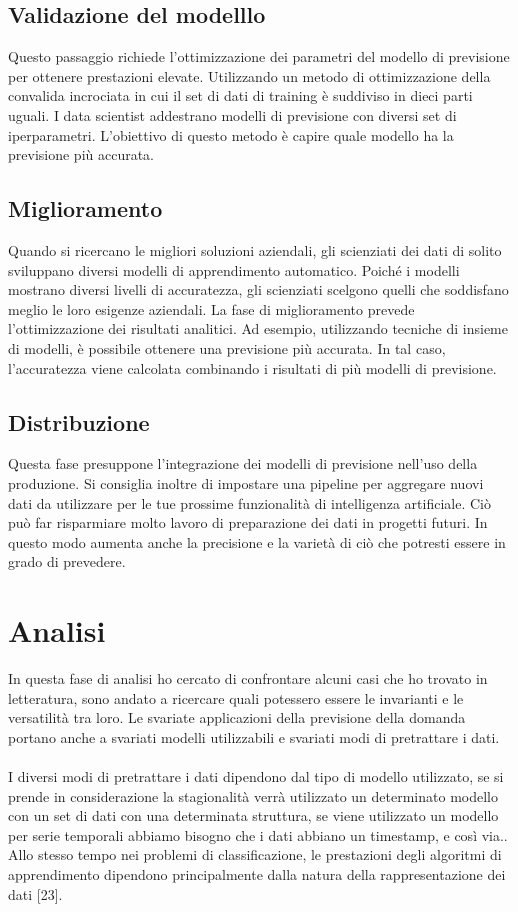 \documentclass[12pt,a4paper]{report}
\begin{document}
\subsection{Validazione del modelllo}
Questo passaggio richiede l'ottimizzazione dei parametri del modello di previsione per ottenere prestazioni elevate. Utilizzando un metodo di ottimizzazione della convalida incrociata in cui il set di dati di training è suddiviso in dieci parti uguali. I data scientist addestrano modelli di previsione con diversi set di iperparametri. L'obiettivo di questo metodo è capire quale modello ha la previsione più accurata.


\subsection{Miglioramento}
Quando si ricercano le migliori soluzioni aziendali, gli scienziati dei dati di solito sviluppano diversi modelli di apprendimento automatico. Poiché i modelli mostrano diversi livelli di accuratezza, gli scienziati scelgono quelli che soddisfano meglio le loro esigenze aziendali. La fase di miglioramento prevede l'ottimizzazione dei risultati analitici. Ad esempio, utilizzando tecniche di insieme di modelli, è possibile ottenere una previsione più accurata. In tal caso, l'accuratezza viene calcolata combinando i risultati di più modelli di previsione.

\subsection{Distribuzione}
Questa fase presuppone l'integrazione dei modelli di previsione nell'uso della produzione. Si consiglia inoltre di impostare una pipeline per aggregare nuovi dati da utilizzare per le tue prossime funzionalità di intelligenza artificiale. Ciò può far risparmiare molto lavoro di preparazione dei dati in progetti futuri. In questo modo aumenta anche la precisione e la varietà di ciò che potresti essere in grado di prevedere.


\section{Analisi}
In questa fase di analisi ho cercato di confrontare alcuni casi che ho trovato in letteratura, sono andato a ricercare quali potessero essere le invarianti e le versatilità tra loro.
Le svariate applicazioni della previsione della domanda portano anche a svariati modelli utilizzabili e svariati modi di pretrattare i dati.\\
\\
I diversi modi di pretrattare i dati dipendono dal tipo di modello utilizzato, se si prende in considerazione la stagionalità verrà utilizzato un determinato modello con un set di dati con una determinata struttura,
se viene utilizzato un modello per serie temporali abbiamo bisogno che i dati abbiano un timestamp, e così via..\\
Allo stesso tempo nei problemi di classificazione, le prestazioni degli algoritmi di apprendimento dipendono principalmente dalla natura della rappresentazione dei dati [23].\\
\end{document}
